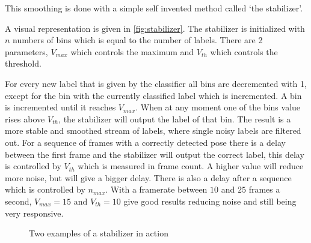 This smoothing is done with a simple self invented method called `the stabilizer'.

A visual representation is given in \autoref{fig:stabilizer}. The stabilizer is initialized with $n$ numbers of bins which is equal to the number of labels. There are 2 parameters, $V_{max}$ which controls the maximum and $V_{th}$ which controls the threshold.

For every new label that is given by the classifier all bins are decremented with 1, except for the bin with the currently classified label which is incremented. A bin is incremented until it reaches $V_{max}$. When at any moment one of the bins value rises above $V_{th}$, the stabilizer will output the label of that bin. The result is a more stable and smoothed stream of labels, where single noisy labels are filtered out. For a sequence of frames with a correctly detected pose there is a delay between the first frame and the stabilizer will output the correct label, this delay is controlled by $V_{th}$ which is measured in frame count. A higher value will reduce more noise, but will give a bigger delay. There is also a delay after a sequence which is controlled by $n_{max}$. With a framerate between $10$ and $25$ frames a second, $V_{max} = 15$ and $V_{th} = 10$ give good results reducing noise and still being very responsive.

\begin{figure}[tb]
  \centering
{}
\hspace{0.03\linewidth}
  \caption{Two examples of a stabilizer in action}
  \label{fig:stabilizer}
\end{figure}

